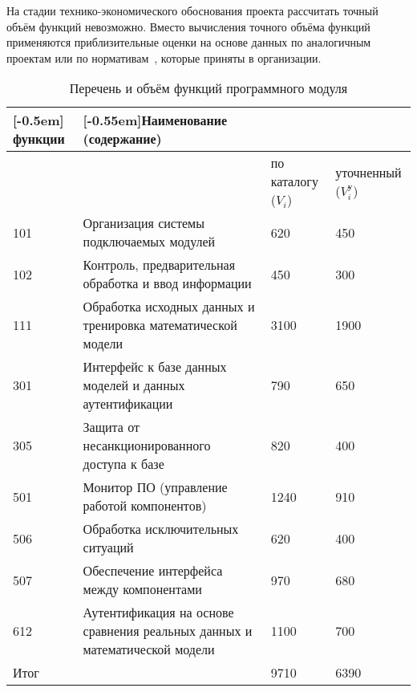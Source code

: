 На стадии технико-экономического обоснования проекта рассчитать точный объём функций невозможно.
Вместо вычисления точного объёма функций применяются приблизительные оценки на основе данных по аналогичным проектам или по нормативам~\cite[с.~61,~приложение 2]{palicyn_2006}, которые приняты в организации.

\def \totalLOC{9710} %
\def \totalLOCCorrected{6390} %

\begin{longtable}{| >{\centering}m{}
                  | >{\raggedright}m{}
                  | >{\centering}m{}
                  | >{\centering\arraybackslash}m{}|}
  \caption{Перечень и объём функций программного модуля}
  \label{table:econ:function_sizes}
  \\

  \hline
    \multirow{2}{0.12\textwidth}[-0.5em]{\centering \No{} функции}
    & \multirow{2}{0.40\textwidth}[-0.55em]{\centering Наименование (содержание)}
    & \multicolumn{2}{c|}{\centering Объём функции, LoC} \tabularnewline

  \cline{3-4} &
       & { по каталогу ($ V_{i} $) }
       & { уточненный ($ V_{i}^{\text{у}} $) } \tabularnewline
  \hline

  101 & Организация системы подключаемых модулей
  & \num{620} & \num{450}
  \\ \hline

  102 & Контроль, предварительная обработка и ввод информации
  & \num{450} & \num{300}
  \\ \hline

  111 & Обработка исходных данных и тренировка математической модели
  & \num{3100} & \num{1900}
  \\ \hline

  301 & Интерфейс к базе данных моделей и данных аутентификации
  & \num{790} & \num{650}
  \\ \hline

  305 & Защита от несанкционированного доступа к базе
  & \num{820} & \num{400}
  \\ \hline

  501 & Монитор ПО (управление работой компонентов)
  & \num{1240} & \num{910}
  \\ \hline

  506 & Обработка исключительных ситуаций
  & \num{620} & \num{400}
  \\ \hline

  507 & Обеспечение интерфейса между компонентами
  & \num{970} & \num{680}
  \\ \hline

  612 & Аутентификация на основе сравнения реальных данных и математической модели
  & \num{1100} & \num{700}
  \\ \hline

  Итог & &
  {\num{\totalLOC}} & {\num{\totalLOCCorrected}}
  \\ \hline

\end{longtable}

